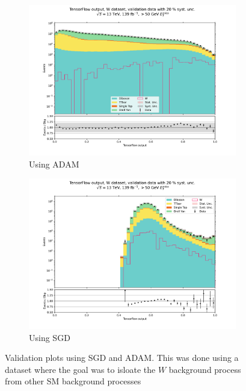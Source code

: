 \documentclass[12pt, a4paper]{book}
\begin{document}
\begin{figure}[!ht]
	\centering
      \begin{subfigure}[b]{0.49\textwidth}
         \centering
         \includegraphics[width=1\textwidth]{Balanced/VAL.pdf}
         \caption{Using ADAM}
      \end{subfigure}
      \begin{subfigure}[b]{0.49\textwidth}
         \centering
         \includegraphics[width=1\textwidth]{SGD/Balanced/VAL.pdf}
         \caption{Using SGD}
      \end{subfigure}
      \caption[Difference between ADAM and SGD optimizer]{Validation plots using SGD and ADAM. 
      This was done using a dataset where the goal was to isloate the $W$ background process from other SM background processes}\label{fig:ADAMvsSGD}
\end{figure}
\end{document}
